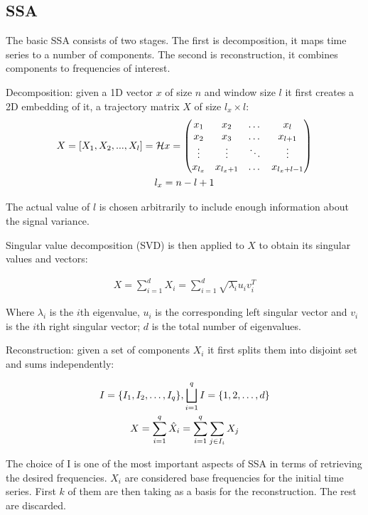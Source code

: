 \documentclass{article}
\begin{document}
\subsection{SSA}

The basic SSA consists of two stages. The first is decomposition, it maps time series to a number of components. The second is reconstruction, it combines components to frequencies of interest.

Decomposition: given a 1D vector \(x\) of size \(n\) and window size \(l\) it first creates a 2D embedding of it, a trajectory matrix \(X\) of size \(l_x \times l\):
\begin{gather}
X = [X_1, X_2, ..., X_{l}] = \mathcal{H} x = 
 \begin{pmatrix}
	x_{1} & x_{2} & \dots & x_{l} \\
	x_{2} & x_{3} & \dots & x_{l + 1} \\
	\vdots & \vdots & \ddots & \vdots \\
	x_{l_{x}} & x_{l_x + 1} &  \dots & x_{l_x + l - 1}
\end{pmatrix} \notag \\
l_x = n - l + 1
\end{gather}

The actual value of \(l\) is chosen arbitrarily to include enough information about the signal variance.

Singular value decomposition (SVD) is then applied to \(X\) to obtain its singular values and vectors:

\begin{gather}
X = \sum \limits_{i = 1}^{d} X_i = \sum \limits_{i = 1}^{d} \sqrt{\lambda_i} u_i v_i^T
\end{gather}

Where \( \lambda_i \) is the \(i\)th eigenvalue, \(u_i\) is the corresponding left singular vector and \(v_i\) is the \(i\)th right singular vector; \(d\) is the total number of eigenvalues.

Reconstruction: given a set of components \(X_i\) it first splits them into disjoint set and sums independently:

\begin{gather}
I = \{ I_1, I_2, \dots, I_q \}, \bigsqcup \limits_{i = 1}^{q} I = \{1, 2, \dots, d\} \notag \\
X = \sum \limits_{i = 1}^{q} \hat{X}_i = \sum \limits_{i = 1}^{q} \sum \limits_{j \in I_i} X_j
\end{gather}

The choice of I is one of the most important aspects of SSA in terms of retrieving the desired frequencies. \(X_i\) are considered base frequencies for the initial time series. First \(k\) of them are then taking as a basis for the reconstruction. The rest are discarded.
\end{document}
